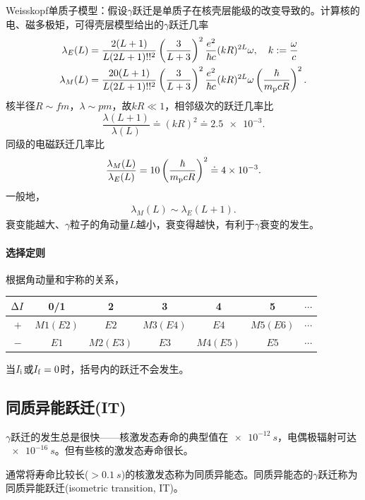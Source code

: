Weisskopf单质子模型：假设$\gamma$跃迁是单质子在核壳层能级的改变导致的。计算核的电、磁多极矩，可得壳层模型给出的$\gamma$跃迁几率
\begin{align*}
	\lambda_E(L)&=\frac{2(L+1)}{L(2L+1)!!^2}\left(\frac{3}{L+3}\right)^2\frac{e^2}{\hbar c}(kR)^{2L}\omega,\quad k:=\frac\omega{c}\\
	\lambda_M(L)&=\frac{20(L+1)}{L(2L+1)!!^2}\left(\frac{3}{L+3}\right)^2\frac{e^2}{\hbar c}(kR)^{2L}\omega\left(\frac\hbar{m_\mathrm p cR}\right)^2.
\end{align*}
核半径$R\sim\si{fm}$，$\lambda\sim\si{pm}$，故$kR\ll 1$，相邻级次的跃迁几率比
\[
	\frac{\lambda(L+1)}{\lambda(L)}\doteq(kR)^2\doteq\num{2.5e-3}.
\]
同级的电磁跃迁几率比
\[
	\frac{\lambda_M(L)}{\lambda_E(L)}=10\left(\frac\hbar{m_\mathrm p cR}\right)^2\doteq\num{4e-3}.
\]
一般地，
\begin{align}
	\lambda_M(L)\sim\lambda_E(L+1).
\end{align}
衰变能越大、$\gamma$粒子的角动量$L$越小，衰变得越快，有利于$\gamma$衰变的发生。%

\paragraph{选择定则}根据角动量和宇称的关系，
\begin{center}
	\begin{tabular}{ccccccc}
		\toprule
		$\Delta I$&0/1&2&3&4&5&$\cdots$\\
		\midrule
		$+$&$M1(E2)$&$E2$&$M3(E4)$&$E4$&$M5(E6)$&$\cdots$\\
		$-$&$E1$&$M2(E3)$&$E3$&$M4(E5)$&$E5$&$\cdots$\\
		\bottomrule
	\end{tabular}
\end{center}
\begin{remark}
	当$I_{\mathrm{i}}$或$I_{\mathrm{f}}=0$时，括号内的跃迁不会发生。
\end{remark}

\subsection{同质异能跃迁(IT)}

$\gamma$跃迁的发生总是很快——核激发态寿命的典型值在$\SI{e-12}{s}$，电偶极辐射可达$\SI{e-16}{s}$。但有些核的激发态寿命很长。

通常将寿命比较长($>\SI{0.1}{s}$)的核激发态称为同质异能态。同质异能态的$\gamma$跃迁称为同质异能跃迁(isometric transition, IT)。

